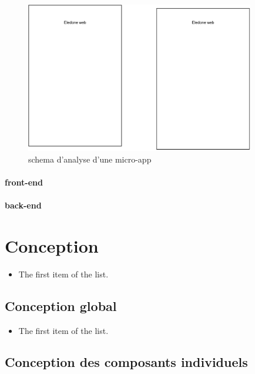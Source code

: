 \documentclass{rapport_stage}
\begin{document}
\begin{figure}[ht]
  \centering
  \includegraphics[width=10cm]{figures/eledone.pdf}
  \caption{schema d'analyse d'une micro-app}
  \label{fig:analyse-micro-app}
\end{figure}

\subsection*{front-end}

\subsection*{back-end}




\part{Conception}

\begin{itemize}[label=$\bullet$]
  \item The first item of the list.
\end{itemize}

\chapter{Conception global}

\begin{itemize}[label=$\bullet$]
  \item The first item of the list.
\end{itemize}

\chapter{Conception des composants individuels}
\end{document}
